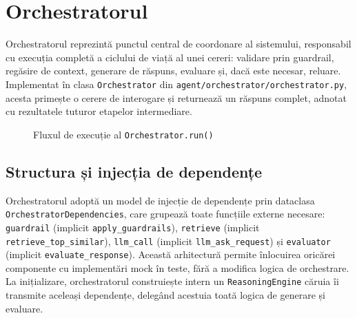 \documentclass[12pt, a4paper, oneside, romanian]{teza-upb}
\begin{document}
\section{Orchestratorul}

Orchestratorul reprezintă punctul central de coordonare al sistemului, responsabil cu execuția completă a ciclului de viață al unei cereri: validare prin guardrail, regăsire de context, generare de răspuns, evaluare și, dacă este necesar, reluare. Implementat în clasa \texttt{Orchestrator} din \texttt{agent/orchestrator/orchestrator.py}, acesta primește o cerere de interogare și returnează un răspuns complet, adnotat cu rezultatele tuturor etapelor intermediare.

\begin{figure}[H]
\centering
{}
\caption{Fluxul de execuție al \texttt{Orchestrator.run()}}
\label{fig:orchestrator}
\end{figure}

\subsection{Structura și injecția de dependențe}

Orchestratorul adoptă un model de injecție de dependențe prin dataclasa \texttt{OrchestratorDependencies}, care grupează toate funcțiile externe necesare: \texttt{guardrail} (implicit \texttt{apply\_guardrails}), \texttt{retrieve} (implicit \texttt{retrieve\_top\_similar}), \texttt{llm\_call} (implicit \texttt{llm\_ask\_request}) și \texttt{evaluator} (implicit \texttt{evaluate\_response}). Această arhitectură permite înlocuirea oricărei componente cu implementări mock în teste, fără a modifica logica de orchestrare. La inițializare, orchestratorul construiește intern un \texttt{ReasoningEngine} căruia îi transmite aceleași dependențe, delegând acestuia toată logica de generare și evaluare.
\end{document}

